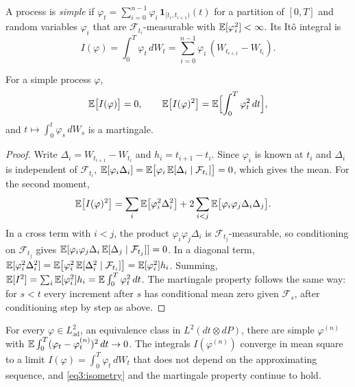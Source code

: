 \begin{chapterrefs}
\begin{definition}\label{def3:simple}
A process is \emph{simple} if $\varphi_t=\sum_{i=0}^{n-1}\varphi_i\,\mathbf 1_{[t_i,t_{i+1})}(t)$ for a
partition of $[0,T]$ and random variables $\varphi_i$ that are $\mathcal F_{t_i}$-measurable with
$\mathbb{E}[\varphi_i^2]<\infty$. Its It\^o integral is
\begin{equation}\label{eq3:simpleint}
  I(\varphi) = \int_0^T\varphi_t\,dW_t = \sum_{i=0}^{n-1}\varphi_i\,(W_{t_{i+1}}-W_{t_i}) .
\end{equation}
\end{definition}

\begin{proposition}\label{prop3:isometry}
For a simple process $\varphi$,
\begin{equation}\label{eq3:isometry}
  \mathbb{E}\bigl[I(\varphi)\bigr]=0,\qquad
  \mathbb{E}\bigl[I(\varphi)^2\bigr]=\mathbb{E}\Bigl[\int_0^T\varphi_t^2\,dt\Bigr],
\end{equation}
and $t\mapsto\int_0^t\varphi_s\,dW_s$ is a martingale.
\end{proposition}

\begin{proof}
Write $\Delta_i=W_{t_{i+1}}-W_{t_i}$ and $h_i=t_{i+1}-t_i$. Since $\varphi_i$ is known at $t_i$ and
$\Delta_i$ is independent of $\mathcal F_{t_i}$,
$\mathbb{E}[\varphi_i\Delta_i]=\mathbb{E}\bigl[\varphi_i\,\mathbb{E}[\Delta_i\mid\mathcal F_{t_i}]\bigr]=0$, which gives the mean.
For the second moment,
\begin{align*}
  \mathbb{E}\bigl[I(\varphi)^2\bigr]
  &= \sum_i\mathbb{E}\bigl[\varphi_i^2\Delta_i^2\bigr] + 2\sum_{i<j}\mathbb{E}\bigl[\varphi_i\varphi_j\Delta_i\Delta_j\bigr] .
\end{align*}
In a cross term with $i<j$, the product $\varphi_i\varphi_j\Delta_i$ is $\mathcal F_{t_j}$-measurable,
so conditioning on $\mathcal F_{t_j}$ gives
$\mathbb{E}[\varphi_i\varphi_j\Delta_i\,\mathbb{E}[\Delta_j\mid\mathcal F_{t_j}]]=0$. In a diagonal term,
$\mathbb{E}[\varphi_i^2\Delta_i^2]=\mathbb{E}\bigl[\varphi_i^2\,\mathbb{E}[\Delta_i^2\mid\mathcal F_{t_i}]\bigr]=\mathbb{E}[\varphi_i^2]h_i$.
Summing, $\mathbb{E}[I^2]=\sum_i\mathbb{E}[\varphi_i^2]h_i=\mathbb{E}\int_0^T\varphi_t^2\,dt$. The martingale property follows
the same way: for $s<t$ every increment after $s$ has conditional mean zero given $\mathcal F_s$, after
conditioning step by step as above.
\end{proof}

\begin{theorem}\label{thm3:itoext}
For every $\varphi\in L^2_{\mathrm{ad}}$, an equivalence class in $L^2(dt\otimes dP)$, there are simple $\varphi^{(n)}$ with
$\mathbb{E}\int_0^T(\varphi_t-\varphi_t^{(n)})^2\,dt\to0$. The integrals $I(\varphi^{(n)})$ converge in mean square
to a limit $I(\varphi)=\int_0^T\varphi_t\,dW_t$ that does not depend on the approximating sequence,
and \cref{eq3:isometry} and the martingale property continue to hold.
\end{theorem}


\end{chapterrefs}
